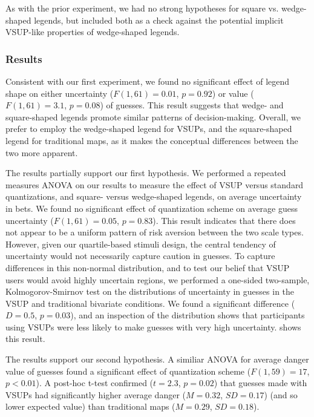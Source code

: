 As with the prior experiment, we had no strong hypotheses for square vs. wedge-shaped legends, but included both as a check against the potential implicit VSUP-like properties of wedge-shaped legends.

\subsubsection{Results} 
\taskTwoQuartiles

Consistent with our first experiment, we found no significant effect of legend shape on either uncertainty ($F(1,61) = 0.01$, $p=0.92$) or value ($F(1,61)=3.1$, $p=0.08$) of guesses. This result suggests that wedge- and square-shaped legends promote similar patterns of decision-making. Overall, we prefer to employ the wedge-shaped legend for VSUPs, and the square-shaped legend for traditional maps, as it makes the conceptual differences between the two more apparent.

The results partially support our first hypothesis. We performed a repeated measures ANOVA on our results to measure the effect of VSUP versus standard quantizations, and square- versus wedge-shaped legends, on average uncertainty in bets. We found no significant effect of quantization scheme on average guess uncertainty ($F(1,61)=0.05$, $p=0.83$). This result indicates that there does not appear to be a uniform pattern of risk aversion between the two scale types. However, given our quartile-based stimuli design, the central tendency of uncertainty would not necessarily capture caution in guesses. To capture differences in this non-normal distribution, and to test our belief that VSUP users would avoid highly uncertain regions, we performed a one-sided two-sample, Kolmogorov-Smirnov test on the distributions of uncertainty in guesses in the VSUP and traditional bivariate conditions. We found a significant difference ($D = 0.5$, $p=0.03$), and an inspection of the distribution shows that participants using VSUPs were less likely to make guesses with very high uncertainty.  shows this result.

The results support our second hypothesis. A similiar ANOVA for average danger value of guesses found a significant effect of quantization scheme ($F(1,59)=17$, $p<0.01$). A post-hoc t-test confirmed ($t=2.3$, $p=0.02$) that guesses made with VSUPs had significantly higher average danger ($M=0.32$, $SD=0.17$) (and so lower expected value) than traditional maps ($M=0.29$, $SD=0.18$).

